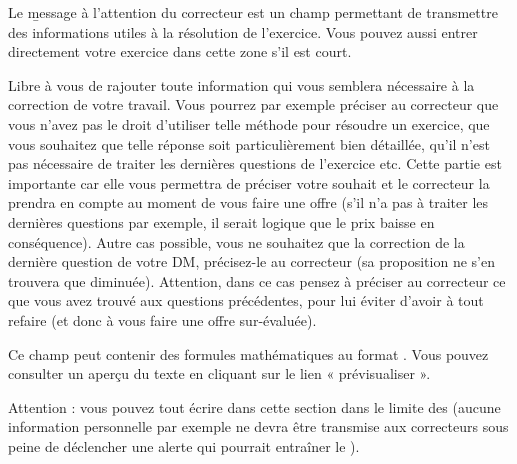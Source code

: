 Le \b{message à l'attention du correcteur} est un champ permettant de transmettre des informations utiles à la résolution de l'exercice.
Vous pouvez aussi entrer directement votre exercice dans cette zone s'il est court.

Libre à vous de rajouter toute information qui vous semblera nécessaire à la correction de votre travail. Vous pourrez par exemple préciser au correcteur que vous n'avez pas le droit d'utiliser telle méthode pour résoudre un exercice, que vous souhaitez que telle réponse soit particulièrement bien détaillée, qu'il n'est pas nécessaire de traiter les dernières questions de l'exercice etc. Cette partie est importante car elle vous permettra de préciser votre souhait et le correcteur la prendra en compte au moment de vous faire une offre (s'il n'a pas à traiter les dernières questions par exemple, il serait logique que le prix baisse en conséquence). Autre cas possible, vous ne souhaitez que la correction de la dernière question de votre DM, précisez-le au correcteur (sa proposition ne s'en trouvera que diminuée). Attention, dans ce cas pensez à préciser au correcteur ce que vous avez trouvé aux questions précédentes, pour lui éviter d'avoir à tout refaire (et donc à vous faire une offre sur-évaluée).

Ce champ peut contenir des formules mathématiques au format . Vous pouvez consulter un aperçu du texte en cliquant sur le lien « prévisualiser ».

Attention : vous pouvez tout écrire dans cette section dans le limite des  (aucune information personnelle par exemple ne devra être transmise aux correcteurs sous peine de déclencher une alerte qui pourrait entraîner le ).